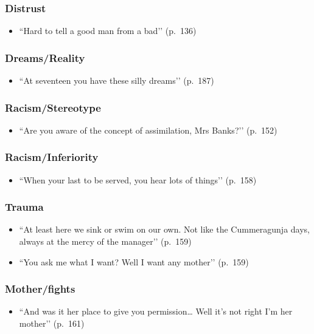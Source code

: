 \documentclass[a4paper]{article}
\begin{document}
\subsubsection{Distrust}
\begin{itemize}
    \item ``Hard to tell a good man from a bad’’ (p.~136)
\end{itemize}

\subsubsection{Dreams/Reality}
\begin{itemize}
    \item ``At seventeen you have these silly dreams’’ (p.~187)
\end{itemize}

\subsubsection{Racism/Stereotype}
\begin{itemize}
    \item ``Are you aware of the concept of assimilation, Mrs Banks?’’ (p.~152)
\end{itemize}

\subsubsection{Racism/Inferiority}
\begin{itemize}
    \item ``When your last to be served, you hear lots of things’’ (p.~158)
\end{itemize}

\subsubsection{Trauma}
\begin{itemize}
    \item ``At least here we sink or swim on our own. Not like the Cummeragunja days, always at the mercy of the manager’’ (p.~159)
    \item ``You ask me what I want? Well I want any mother’’ (p.~159)
\end{itemize}

\subsubsection{Mother/fights}
\begin{itemize}
    \item ``And was it her place to give you permission… Well it’s not right I’m her mother’’ (p.~161)
\end{itemize}
\end{document}
